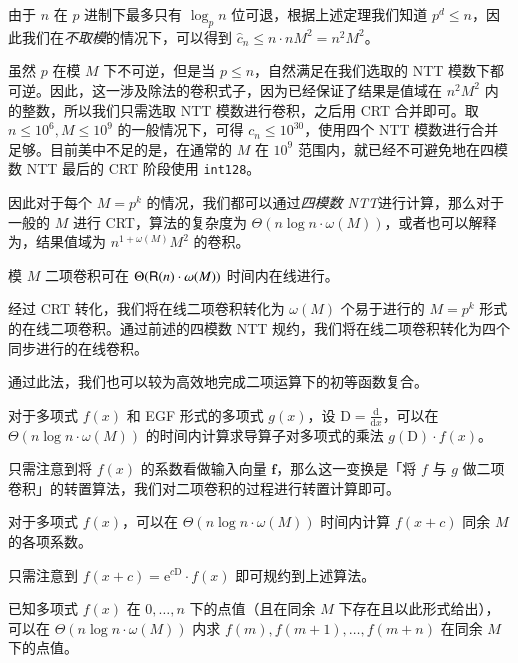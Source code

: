 由于 $n$ 在 $p$ 进制下最多只有 $\log_p n$ 位可退，根据上述定理我们知道 $p^d \le n$，因此我们在\emph{不取模}的情况下，可以得到 $\widehat c_n \le n \cdot nM^2 = n^2M^2$。

虽然 $p$ 在模 $M$ 下不可逆，但是当 $p\le n$，自然满足在我们选取的 NTT 模数下都可逆。因此，这一涉及除法的卷积式子，因为已经保证了结果是值域在 $n^2M^2$ 内的整数，所以我们只需选取 NTT 模数进行卷积，之后用 CRT 合并即可。取 $n\le 10^6, M\le 10^9$ 的一般情况下，可得 $c_n \le 10^{30}$，使用四个 NTT 模数进行合并足够。目前美中不足的是，在通常的 $M$ 在 $10^9$ 范围内，就已经不可避免地在四模数 NTT 最后的 CRT 阶段使用 \texttt{int128}。

因此对于每个 $M=p^k$ 的情况，我们都可以通过\emph{四模数 NTT}进行计算，那么对于一般的 $M$ 进行 CRT，算法的复杂度为 $\Theta(n\log n \cdot \omega(M))$，或者也可以解释为，结果值域为 $n^{1+\omega(M)}M^2$ 的卷积。

\begin{theorem}
模 $M$ 二项卷积可在 $\Theta(\mathsf R(n)\cdot \omega(M))$ 时间内在线进行。
\end{theorem}

经过 CRT 转化，我们将在线二项卷积转化为 $\omega(M)$ 个易于进行的 $M=p^k$ 形式的在线二项卷积。通过前述的四模数 NTT 规约，我们将在线二项卷积转化为四个同步进行的在线卷积。

通过此法，我们也可以较为高效地完成二项运算下的初等函数复合。

\begin{theorem}
对于多项式 $f(x)$ 和 EGF 形式的多项式 $g(x)$，设 $\mathrm{D} = \frac{\mathrm{d}}{\mathrm{d}x}$，可以在 $\Theta(n\log n \cdot \omega(M))$ 的时间内计算求导算子对多项式的乘法 $g(\mathrm{D}) \cdot f(x)$。
\end{theorem}

只需注意到将 $f(x)$ 的系数看做输入向量 $\mathbf f$，那么这一变换是「将 $f$ 与 $g$ 做二项卷积」的转置算法，我们对二项卷积的过程进行转置计算即可。

\begin{lemma}
对于多项式 $f(x)$，可以在 $\Theta(n\log n \cdot \omega(M))$ 时间内计算 $f(x+c)$ 同余 $M$ 的各项系数。
\end{lemma}

只需注意到 $f(x+c) = \mathrm{e}^{c\mathrm{D}} \cdot f(x)$ 即可规约到上述算法。

\begin{lemma}
已知多项式 $f(x)$ 在 $0,\dots,n$ 下的点值（且在同余 $M$ 下存在且以此形式给出），可以在 $\Theta(n\log n \cdot \omega (M))$ 内求 $f(m),f(m+1),\dots,f(m+n)$ 在同余 $M$ 下的点值。
\end{lemma}

